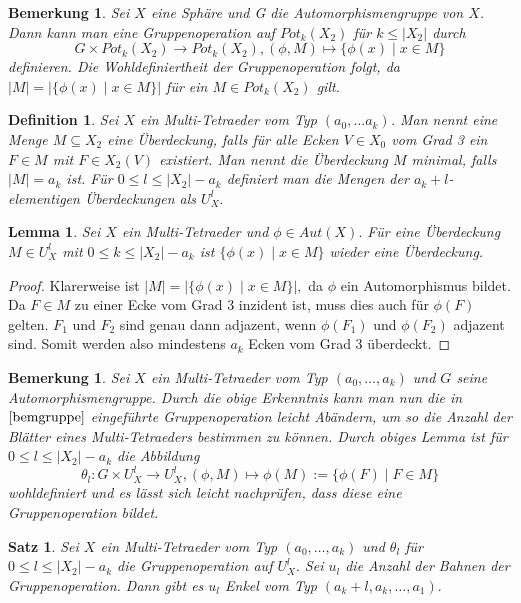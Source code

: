 \documentclass[12pt,titlepage,twoside,cleardoublepage]{article}
\theoremstyle{nummermitklammern}
\newtheorem{lemma}[temp]{Lemma}
\newtheorem{definition}[temp]{Definition}
\newtheorem{bemerkung}[temp]{Bemerkung}
\newtheorem{satz}[temp]{Satz}
\newtheorem{definition}[zahl]{Definition}
\newtheorem{lemma}[zahl]{Lemma}
\newtheorem{bemerkung}[zahl]{Bemerkung}
\newtheorem{satz}[zahl]{Satz}
\numberwithin{equation}{section}
\begin{document}
\begin{bemerkung}\label{bemgruppe}
Sei $X$ eine Sphäre und G die Automorphismengruppe von $X$. Dann kann man eine Gruppenoperation auf $Pot_k(X_2)$ für $k \leq \vert X_2 \vert  $ durch 
\[
G\times Pot_k(X_2) \to Pot_k(X_2),(\phi , M)\mapsto \{\phi(x)\mid x\in M\}
\]
definieren. Die Wohldefiniertheit der Gruppenoperation folgt, da $\vert M\vert=\vert\{\phi (x)\mid x\in M\}\vert$ für ein $M\in Pot_k(X_2)$ gilt.
\end{bemerkung}
\begin{definition}
Sei $X$ ein Multi-Tetraeder vom Typ $(a_0,\ldots a_k)$. Man nennt eine Menge $M\subseteq X_2$ eine Überdeckung, falls für alle Ecken $V\in X_0$ vom Grad 3 ein $F\in M$ mit $F\in X_2(V)$ existiert. Man nennt die Überdeckung $M$ minimal, falls $\vert M\vert=a_k$ ist.
Für $0\leq l\leq \vert X_2\vert -a_k$ definiert man die Mengen der $a_k+l$-elementigen Überdeckungen als
 $U_X^l.$ 
\end{definition}
\begin{lemma}
Sei $X$ ein Multi-Tetraeder und $\phi \in Aut(X).$ Für eine Überdeckung $M\in U_X^l$ mit  $0\leq k\leq \vert X_2\vert -a_k$ ist $\{\phi(x)\mid x\in M\}$ wieder eine Überdeckung. \end{lemma}
\begin{proof}
Klarerweise ist $\vert M\vert =\vert\{\phi(x)\mid x\in M\}\vert,$ da $\phi$ ein Automorphismus bildet.
 Da $F\in M$ zu einer Ecke vom Grad 3 inzident ist, muss dies auch für $\phi(F)$ gelten. $F_1$ und $ F_2$ sind genau dann adjazent, wenn $\phi(F_1)$ und $\phi(F_2)$ adjazent sind. Somit werden also mindestens $a_k$ Ecken vom Grad 3 überdeckt. 
\end{proof}
\begin{bemerkung}
Sei $X$ ein Multi-Tetraeder vom Typ $(a_0,\ldots ,a_k)$ und $G$ seine Automorphismengruppe.
Durch die obige Erkenntnis kann man nun die in $\Cref{bemgruppe}$ eingeführte Gruppenoperation leicht Abändern, um so die Anzahl der Blätter eines Multi-Tetraeders bestimmen zu können. Durch obiges Lemma ist für $0\leq l\leq \vert X_2 \vert -a_k$ die Abbildung
\[
\theta_l: G\times U_X^l \to U_X^l, (\phi, M)\mapsto \phi(M):=\{\phi(F)\mid F\in M\}
\] 
wohldefiniert und es lässt sich leicht nachprüfen, dass diese eine Gruppenoperation bildet.
\end{bemerkung}
\begin{satz}
Sei $X$ ein Multi-Tetraeder vom Typ $(a_0,\ldots,a_k)$ und $\theta_l$ für $0\leq l\leq \vert X_2\vert -a_k$ die Gruppenoperation auf $U_X^l.$ Sei $u_l$ die Anzahl der Bahnen der Gruppenoperation. Dann gibt es $u_l$ Enkel vom Typ $(a_k+l,a_k,\ldots,a_1).$
\end{satz}
\end{document}
